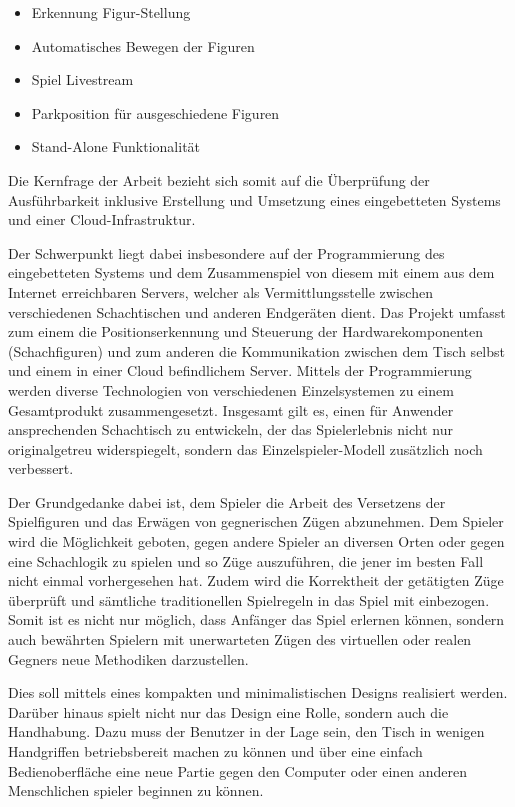 \begin{itemize}
\tightlist
\item
  Erkennung Figur-Stellung
\item
  Automatisches Bewegen der Figuren
\item
  Spiel Livestream
\item
  Parkposition für ausgeschiedene Figuren
\item
  Stand-Alone Funktionalität
\end{itemize}

Die Kernfrage der Arbeit bezieht sich somit auf die Überprüfung der
Ausführbarkeit inklusive Erstellung und Umsetzung eines eingebetteten
Systems und einer Cloud-Infrastruktur.

Der Schwerpunkt liegt dabei insbesondere auf der Programmierung des
eingebetteten Systems und dem Zusammenspiel von diesem mit einem aus dem
Internet erreichbaren Servers, welcher als Vermittlungsstelle zwischen
verschiedenen Schachtischen und anderen Endgeräten dient. Das Projekt
umfasst zum einem die Positionserkennung und Steuerung der
Hardwarekomponenten (Schachfiguren) und zum anderen die Kommunikation
zwischen dem Tisch selbst und einem in einer Cloud befindlichem Server.
Mittels der Programmierung werden diverse Technologien von verschiedenen
Einzelsystemen zu einem Gesamtprodukt zusammengesetzt. Insgesamt gilt
es, einen für Anwender ansprechenden Schachtisch zu entwickeln, der das
Spielerlebnis nicht nur originalgetreu widerspiegelt, sondern das
Einzelspieler-Modell zusätzlich noch verbessert.

Der Grundgedanke dabei ist, dem Spieler die Arbeit des Versetzens der
Spielfiguren und das Erwägen von gegnerischen Zügen abzunehmen. Dem
Spieler wird die Möglichkeit geboten, gegen andere Spieler an diversen
Orten oder gegen eine Schachlogik zu spielen und so Züge auszuführen,
die jener im besten Fall nicht einmal vorhergesehen hat. Zudem wird die
Korrektheit der getätigten Züge überprüft und sämtliche traditionellen
Spielregeln in das Spiel mit einbezogen. Somit ist es nicht nur möglich,
dass Anfänger das Spiel erlernen können, sondern auch bewährten Spielern
mit unerwarteten Zügen des virtuellen oder realen Gegners neue
Methodiken darzustellen.

Dies soll mittels eines kompakten und minimalistischen Designs
realisiert werden. Darüber hinaus spielt nicht nur das Design eine
Rolle, sondern auch die Handhabung. Dazu muss der Benutzer in der Lage
sein, den Tisch in wenigen Handgriffen betriebsbereit machen zu können
und über eine einfach Bedienoberfläche eine neue Partie gegen den
Computer oder einen anderen Menschlichen spieler beginnen zu können.


